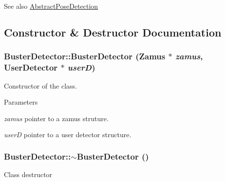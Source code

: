 \begin{DoxySeeAlso}{See also}
\hyperlink{classAbstractPoseDetection}{AbstractPoseDetection} 
\end{DoxySeeAlso}


\subsection{Constructor \& Destructor Documentation}
\hypertarget{classBusterDetector_a9c2ad0b8a83b03fe55ab373fe63a2bf3}{
\subsubsection[{BusterDetector}]{\setlength{\rightskip}{0pt plus 5cm}BusterDetector::BusterDetector ({\bf Zamus} $\ast$ {\em zamus}, \/  {\bf UserDetector} $\ast$ {\em userD})}}
\label{classBusterDetector_a9c2ad0b8a83b03fe55ab373fe63a2bf3}
Constructor of the class. 
\begin{DoxyParams}{Parameters}
\item[{\em zamus}]pointer to a zamus struture. \item[{\em userD}]pointer to a user detector structure. \end{DoxyParams}
\hypertarget{classBusterDetector_a42cf936b77e8e2cd41e341ed2dbf2773}{
\subsubsection[{$\sim$BusterDetector}]{\setlength{\rightskip}{0pt plus 5cm}BusterDetector::$\sim$BusterDetector ()}}
\label{classBusterDetector_a42cf936b77e8e2cd41e341ed2dbf2773}
Class destructor 

